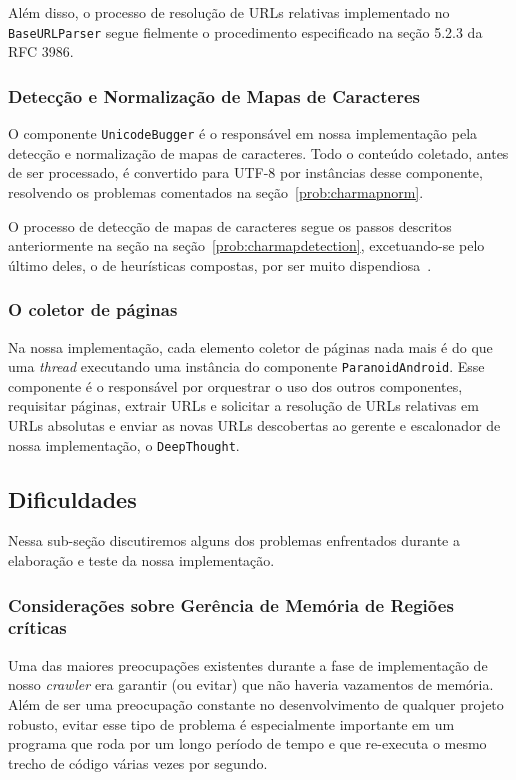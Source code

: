 \documentclass[10pt,twocolumn]{article}
\begin{document}
Além disso, o processo de resolução de URLs relativas implementado no
\texttt{BaseURLParser} segue fielmente o procedimento especificado na
seção 5.2.3 da RFC 3986.

\subsubsection{Detecção e Normalização de Mapas de Caracteres}

O componente \texttt{UnicodeBugger} é o responsável em nossa
implementação pela detecção e normalização de mapas de caracteres.  Todo
o conteúdo coletado, antes de ser processado, é convertido para UTF-8
por instâncias desse componente, resolvendo os problemas comentados na
seção~\ref{prob:charmapnorm}.

O processo de detecção de mapas de caracteres segue os passos descritos
anteriormente na seção na seção~\ref{prob:charmapdetection},
excetuando-se pelo último deles, o de heurísticas compostas, por ser
muito dispendiosa~\cite{mozillaiuc}.

\subsubsection{O coletor de páginas}

Na nossa implementação, cada elemento coletor de páginas nada mais é do
que uma \emph{thread} executando uma instância do componente
\texttt{ParanoidAndroid}. Esse componente é o responsável por orquestrar
o uso dos outros componentes, requisitar páginas, extrair URLs e
solicitar a resolução de URLs relativas em URLs absolutas e enviar as
novas URLs descobertas ao gerente e escalonador de nossa implementação,
o \texttt{DeepThought}.



\subsection{Dificuldades}

Nessa sub-seção discutiremos alguns dos problemas enfrentados durante a
elaboração e teste da nossa implementação.

\subsubsection{Considerações sobre Gerência de Memória de Regiões críticas}

Uma das maiores preocupações existentes durante a fase de implementação
de nosso \emph{crawler} era garantir (ou evitar) que não haveria
vazamentos de memória. Além de ser uma preocupação constante no
desenvolvimento de qualquer projeto robusto, evitar esse tipo de
problema é especialmente importante em um programa que roda por um longo
período de tempo e que re-executa o mesmo trecho de código várias vezes
por segundo.
\end{document}
